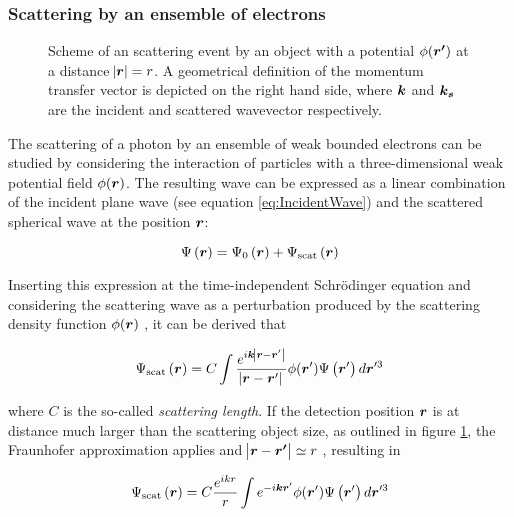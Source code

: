 \subsubsection{Scattering by an ensemble of electrons}

\begin{figure}%
	\centering
	        \def\svgwidth{0.75\linewidth}
		
		\caption{Scheme of an scattering event by an object with a potential $\phi(\bm{r'})$ at a distance $\abs{\bm{r}}=r$. A geometrical definition of the momentum transfer vector is depicted on the right hand side, where $\bm{k}$ and $\bm{k_s}$ are the incident and scattered wavevector respectively.}
		\label{fig:FraunhoferScheme}
\end{figure}

The scattering of a photon by an ensemble of weak bounded electrons can be studied by considering the interaction of particles with a three-dimensional weak potential field $\phi(\bm{r})$. The resulting wave can be expressed as a linear combination of the incident plane wave (see equation \ref{eq:IncidentWave}) and the scattered spherical wave at the position $\bm{r}$:

\begin{equation}
       \Psi\left( \bm{r} \right)= \Psi_0\left( \bm{r} \right) +  \Psi_{\text{scat}}\left( \bm{r} \right)
\end{equation}

Inserting this expression at the time-independent Schrödinger equation and considering the scattering wave as a perturbation produced by the scattering density function $\phi(\bm{r})$ \citep{cowley_diffraction_1995}, it can be derived that

\begin{equation}
       \Psi_{\text{scat}}\left( \bm{r} \right)=C \int \frac{e^{ i \bm{k}\abs{\bm{r}-\bm{r}'} } } {\abs{\bm{r}-\bm{r}'}} \phi(\bm{r}')   \Psi\left( \bm{r}' \right) d\bm{r}'^3
\end{equation}

where $C$ is the so-called \emph{scattering length}. If the detection position $\bm{r}$ is at distance much larger than the scattering object size, as outlined in figure \ref{fig:FraunhoferScheme}, the Fraunhofer approximation applies and $\abs{\bm{r}-\bm{r'}} \simeq r$ \citep{feigin_structure_1987}, resulting in

\begin{equation}
       \Psi_{\text{scat}}\left( \bm{r} \right)=C \frac{e^{i k r}}{r} \int e^{ -i \bm{k}\bm{r}' }  \phi(\bm{r}')   \Psi\left( \bm{r}' \right) d\bm{r}'^3
\end{equation}

